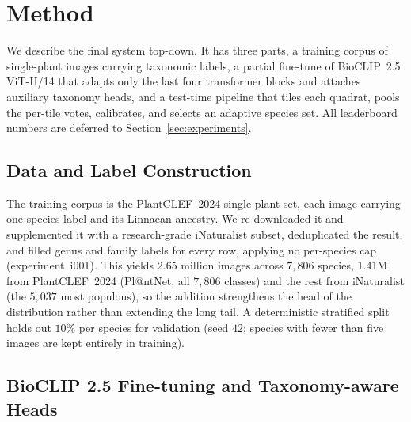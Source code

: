 \chapter{Method}
\label{sec:method}

We describe the final system top-down. It has three parts, a training corpus of single-plant images carrying taxonomic labels, a partial fine-tune of BioCLIP~2.5 ViT-H/14 that adapts only the last four transformer blocks and attaches auxiliary taxonomy heads, and a test-time pipeline that tiles each quadrat, pools the per-tile votes, calibrates, and selects an adaptive species set. All leaderboard numbers are deferred to Section~\ref{sec:experiments}.

\section{Data and Label Construction}
\label{sec:cap_extra}

The training corpus is the PlantCLEF~2024 single-plant set, each image carrying one species label and its Linnaean ancestry. We re-downloaded it and supplemented it with a research-grade iNaturalist subset, deduplicated the result, and filled genus and family labels for every row, applying no per-species cap (experiment~i001). This yields 2.65 million images across $7{,}806$ species, 1.41M from PlantCLEF~2024 (Pl@ntNet, all $7{,}806$ classes) and the rest from iNaturalist (the $5{,}037$ most populous), so the addition strengthens the head of the distribution rather than extending the long tail. A deterministic stratified split holds out $10\%$ per species for validation (seed $42$; species with fewer than five images are kept entirely in training).

\section{BioCLIP 2.5 Fine-tuning and Taxonomy-aware Heads}
\label{sec:backbone}

